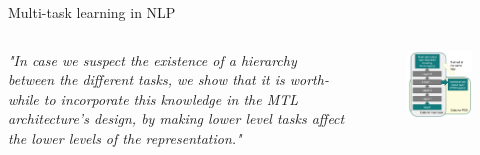 \documentclass[12pt,aspectratio=169,handout]{beamer}
\begin{document}
\begin{frame}{Multi-task learning in NLP}
	
	\begin{columns}
		\begin{column}{0.5\linewidth}
			
			\begin{small}
				\emph{"In case we suspect the existence of a hierarchy between the different tasks, we show that it is worth-while to incorporate this knowledge in the MTL architecture’s design, by making lower level tasks affect the lower levels of the representation." }
			\end{small}			
		\end{column}
		\begin{column}{0.5\linewidth}
			
			\begin{figure}
				\includegraphics[width=\linewidth]{img/multitask-nlp.png}
			\end{figure}
		\end{column}
	\end{columns}
	
	\bigskip
	
	\begin{footnotesize}
	\end{footnotesize}
	
\end{frame}
\end{document}
